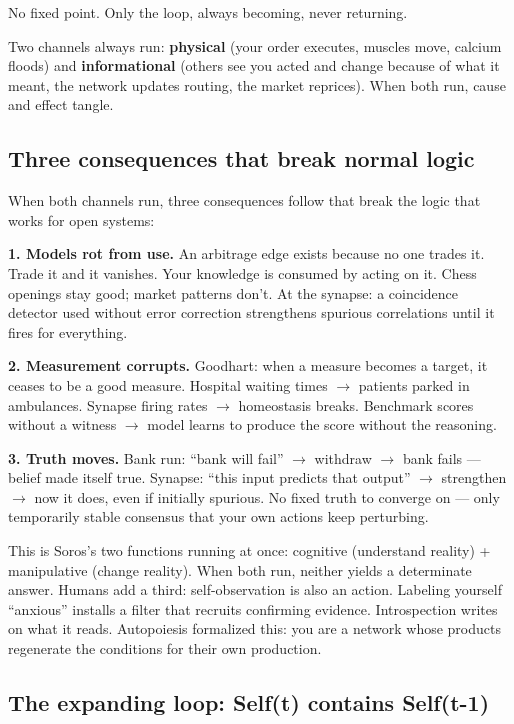 \documentclass[11pt]{article}
\begin{document}
No fixed point. Only the loop, always becoming, never returning.

Two channels always run: \textbf{physical} (your order executes, muscles move, calcium floods) and \textbf{informational} (others see you acted and change because of what it meant, the network updates routing, the market reprices). When both run, cause and effect tangle.

\subsection{Three consequences that break normal logic}

When both channels run, three consequences follow that break the logic that works for open systems:

\textbf{1. Models rot from use.} An arbitrage edge exists because no one trades it. Trade it and it vanishes. Your knowledge is consumed by acting on it. Chess openings stay good; market patterns don't. At the synapse: a coincidence detector used without error correction strengthens spurious correlations until it fires for everything.

\textbf{2. Measurement corrupts.} Goodhart: when a measure becomes a target, it ceases to be a good measure. Hospital waiting times $\to$\allowbreak{} patients parked in ambulances. Synapse firing rates $\to$\allowbreak{} homeostasis breaks. Benchmark scores without a witness $\to$\allowbreak{} model learns to produce the score without the reasoning.

\textbf{3. Truth moves.} Bank run: ``bank will fail'' $\to$\allowbreak{} withdraw $\to$\allowbreak{} bank fails --- belief made itself true. Synapse: ``this input predicts that output'' $\to$\allowbreak{} strengthen $\to$\allowbreak{} now it does, even if initially spurious. No fixed truth to converge on --- only temporarily stable consensus that your own actions keep perturbing.

This is Soros's two functions running at once: cognitive (understand reality) + manipulative (change reality). When both run, neither yields a determinate answer. Humans add a third: self-observation is also an action. Labeling yourself ``anxious'' installs a filter that recruits confirming evidence. Introspection writes on what it reads. Autopoiesis formalized this: you are a network whose products regenerate the conditions for their own production.

\subsection{The expanding loop: Self(t) contains Self(t-1)}
\end{document}

